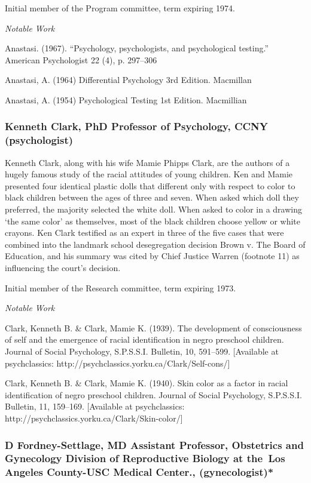 \begin{refsection}
Initial member of the Program committee, term expiring 1974.

\emph{Notable Work}

Anastasi. (1967). ``Psychology, psychologists, and psychological testing.'' American Psychologist 22 (4), p. 297--306

Anastasi, A. (1964) Differential Psychology 3rd Edition. Macmillan

Anastasi, A. (1954) Psychological Testing 1st Edition. Macmillian

\subsubsection{Kenneth Clark, PhD Professor of Psychology, CCNY (psychologist)}
\label{kennethclarkphdprofessorofpsychologyccnypsychologist}

Kenneth Clark, along with his wife Mamie Phipps Clark, are the authors of a hugely famous study of the racial attitudes of young children. Ken and Mamie presented four identical plastic dolls that different only with respect to color to black children between the ages of three and seven. When asked which doll they preferred, the majority selected the white doll. When asked to color in a drawing `the same color' as themselves, most of the black children choose yellow or white crayons. Ken Clark testified as an expert in three of the five cases that were combined into the landmark school desegregation decision Brown v. The Board of Education, and his summary was cited by Chief Justice Warren (footnote 11) as influencing the court's decision.

Initial member of the Research committee, term expiring 1973.

\emph{Notable Work}

Clark, Kenneth B. \& Clark, Mamie K. (1939). The development of consciousness of self and the emergence of racial identification in negro preschool children. Journal of Social Psychology, S.P.S.S.I. Bulletin, 10, 591--599. [Available at psychclassics: http:\slash \slash psychclassics.yorku.ca\slash Clark\slash Self-cons\slash ]

Clark, Kenneth B. \& Clark, Mamie K. (1940). Skin color as a factor in racial identification of negro preschool children. Journal of Social Psychology, S.P.S.S.I. Bulletin, 11, 159--169. [Available at psychclassics: http:\slash \slash psychclassics.yorku.ca\slash Clark\slash Skin-color\slash ]

\subsubsection{D Fordney-Settlage, MD Assistant Professor, Obstetrics and Gynecology Division of Reproductive Biology at the Los Angeles County-USC Medical Center., (gynecologist)*}
\label{dfordney-settlagemdassistantprofessorobstetricsandgynecologydivisionofreproductivebiologyatthe losangelescounty-uscmedicalcenter.gynecologist}


\end{refsection}
